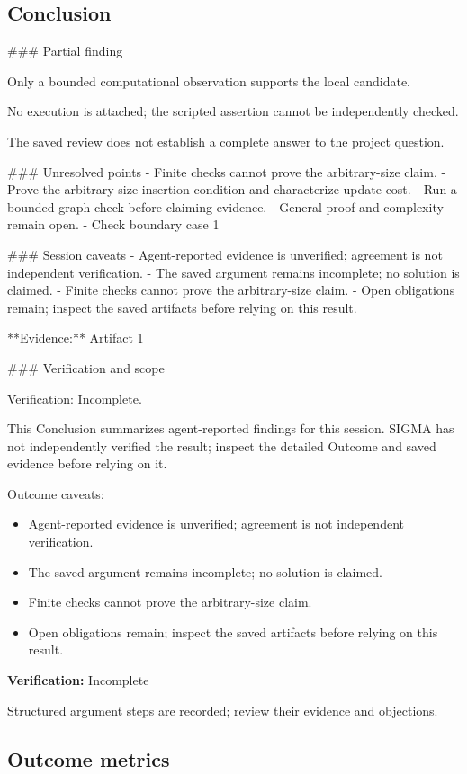 \documentclass[11pt]{article}
\begin{document}
\subsection{Conclusion}
\#\#\# Partial finding

Only a bounded computational observation supports the local candidate.

No execution is attached; the scripted assertion cannot be independently checked.

The saved review does not establish a complete answer to the project question.

\#\#\# Unresolved points
- Finite checks cannot prove the arbitrary-size claim.
- Prove the arbitrary-size insertion condition and characterize update cost.
- Run a bounded graph check before claiming evidence.
- General proof and complexity remain open.
- Check boundary case 1

\#\#\# Session caveats
- Agent-reported evidence is unverified; agreement is not independent verification.
- The saved argument remains incomplete; no solution is claimed.
- Finite checks cannot prove the arbitrary-size claim.
- Open obligations remain; inspect the saved artifacts before relying on this result.

**Evidence:** Artifact 1

\#\#\# Verification and scope

Verification: Incomplete.

This Conclusion summarizes agent-reported findings for this session. SIGMA has not independently verified the result; inspect the detailed Outcome and saved evidence before relying on it.\par
Outcome caveats:\par
\begin{itemize}
\item Agent-reported evidence is unverified; agreement is not independent verification.
\item The saved argument remains incomplete; no solution is claimed.
\item Finite checks cannot prove the arbitrary-size claim.
\item Open obligations remain; inspect the saved artifacts before relying on this result.
\end{itemize}
\textbf{Verification:} Incomplete\par
Structured argument steps are recorded; review their evidence and objections.\par
\subsection{Outcome metrics}
\end{document}
